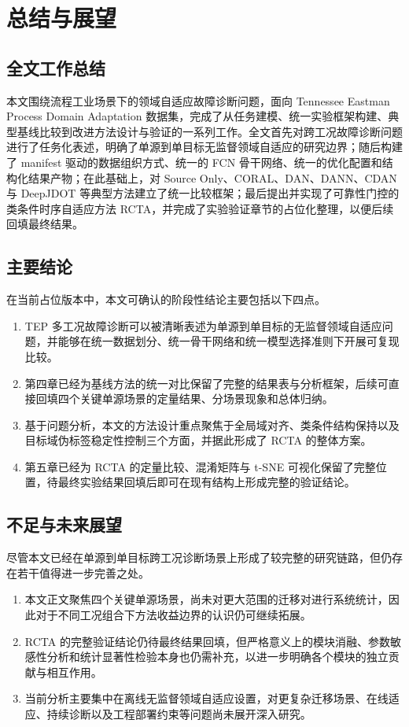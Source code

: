 \chapter{总结与展望}

\section{全文工作总结}
本文围绕流程工业场景下的领域自适应故障诊断问题，面向 Tennessee Eastman Process Domain Adaptation 数据集，完成了从任务建模、统一实验框架构建、典型基线比较到改进方法设计与验证的一系列工作。全文首先对跨工况故障诊断问题进行了任务化表述，明确了单源到单目标无监督领域自适应的研究边界；随后构建了 manifest 驱动的数据组织方式、统一的 FCN 骨干网络、统一的优化配置和结构化结果产物；在此基础上，对 Source Only、CORAL、DAN、DANN、CDAN 与 DeepJDOT 等典型方法建立了统一比较框架；最后提出并实现了可靠性门控的类条件时序自适应方法 RCTA，并完成了实验验证章节的占位化整理，以便后续回填最终结果。

\section{主要结论}
在当前占位版本中，本文可确认的阶段性结论主要包括以下四点。

\begin{enumerate}
\item TEP 多工况故障诊断可以被清晰表述为单源到单目标的无监督领域自适应问题，并能够在统一数据划分、统一骨干网络和统一模型选择准则下开展可复现比较。
\item 第四章已经为基线方法的统一对比保留了完整的结果表与分析框架，后续可直接回填四个关键单源场景的定量结果、分场景现象和总体归纳。
\item 基于问题分析，本文的方法设计重点聚焦于全局域对齐、类条件结构保持以及目标域伪标签稳定性控制三个方面，并据此形成了 RCTA 的整体方案。
\item 第五章已经为 RCTA 的定量比较、混淆矩阵与 t-SNE 可视化保留了完整位置，待最终实验结果回填后即可在现有结构上形成完整的验证结论。
\end{enumerate}

\section{不足与未来展望}
尽管本文已经在单源到单目标跨工况诊断场景上形成了较完整的研究链路，但仍存在若干值得进一步完善之处。

\begin{enumerate}
\item 本文正文聚焦四个关键单源场景，尚未对更大范围的迁移对进行系统统计，因此对于不同工况组合下方法收益边界的认识仍可继续拓展。
\item RCTA 的完整验证结论仍待最终结果回填，但严格意义上的模块消融、参数敏感性分析和统计显著性检验本身也仍需补充，以进一步明确各个模块的独立贡献与相互作用。
\item 当前分析主要集中在离线无监督领域自适应设置，对更复杂迁移场景、在线适应、持续诊断以及工程部署约束等问题尚未展开深入研究。
\end{enumerate}


